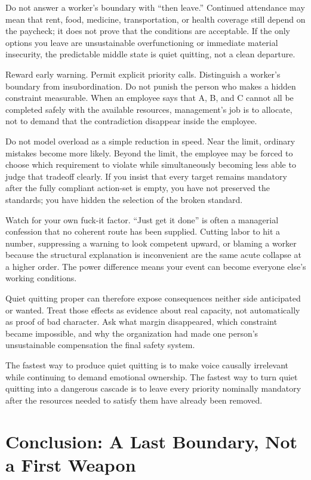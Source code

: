 \documentclass[11pt,oneside]{article}
\begin{document}
Do not answer a worker's boundary with ``then leave.'' Continued
attendance may mean that rent, food, medicine, transportation, or health
coverage still depend on the paycheck; it does not prove that the
conditions are acceptable. If the only options you leave are
unsustainable overfunctioning or immediate material insecurity, the
predictable middle state is quiet quitting, not a clean departure.

Reward early warning. Permit explicit priority calls. Distinguish a
worker's boundary from insubordination. Do not punish the person who
makes a hidden constraint measurable. When an employee says that A, B,
and C cannot all be completed safely with the available resources,
management's job is to allocate, not to demand that the contradiction
disappear inside the employee.

Do not model overload as a simple reduction in speed. Near the limit,
ordinary mistakes become more likely. Beyond the limit, the employee may
be forced to choose which requirement to violate while simultaneously
becoming less able to judge that tradeoff clearly. If you insist that
every target remains mandatory after the fully compliant action-set is
empty, you have not preserved the standards; you have hidden the
selection of the broken standard.

Watch for your own fuck-it factor. ``Just get it done'' is often a
managerial confession that no coherent route has been supplied. Cutting
labor to hit a number, suppressing a warning to look competent upward,
or blaming a worker because the structural explanation is inconvenient
are the same acute collapse at a higher order. The power difference
means your event can become everyone else's working conditions.

Quiet quitting proper can therefore expose consequences neither side
anticipated or wanted. Treat those effects as evidence about real
capacity, not automatically as proof of bad character. Ask what margin
disappeared, which constraint became impossible, and why the
organization had made one person's unsustainable compensation the final
safety system.

The fastest way to produce quiet quitting is to make voice causally
irrelevant while continuing to demand emotional ownership. The fastest
way to turn quiet quitting into a dangerous cascade is to leave every
priority nominally mandatory after the resources needed to satisfy them
have already been removed.

\section{Conclusion: A Last Boundary, Not a First
Weapon}\label{conclusion-a-last-boundary-not-a-first-weapon}
\end{document}
